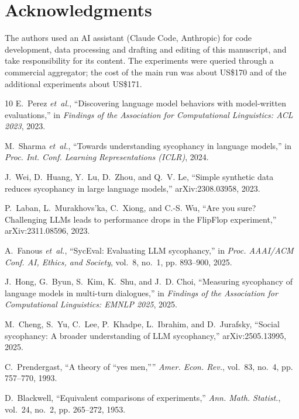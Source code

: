 \documentclass[journal]{IEEEtran}
\begin{document}
\section*{Acknowledgments}
The authors used an AI assistant (Claude Code, Anthropic) for code development, data processing and drafting and editing of this manuscript, and take responsibility for its content. The experiments were queried through a commercial aggregator; the cost of the main run was about US\$170 and of the additional experiments about US\$171.

\begin{thebibliography}{10}
E.~Perez \emph{et~al.}, ``Discovering language model behaviors with model-written evaluations,'' in \emph{Findings of the Association for Computational Linguistics: ACL 2023}, 2023.

M.~Sharma \emph{et~al.}, ``Towards understanding sycophancy in language models,'' in \emph{Proc. Int. Conf. Learning Representations (ICLR)}, 2024.

J.~Wei, D.~Huang, Y.~Lu, D.~Zhou, and Q.~V. Le, ``Simple synthetic data reduces sycophancy in large language models,'' arXiv:2308.03958, 2023.

P.~Laban, L.~Murakhovs'ka, C.~Xiong, and C.-S. Wu, ``Are you sure? Challenging LLMs leads to performance drops in the FlipFlop experiment,'' arXiv:2311.08596, 2023.

A.~Fanous \emph{et~al.}, ``SycEval: Evaluating LLM sycophancy,'' in \emph{Proc. AAAI/ACM Conf. AI, Ethics, and Society}, vol.~8, no.~1, pp. 893--900, 2025.

J.~Hong, G.~Byun, S.~Kim, K.~Shu, and J.~D. Choi, ``Measuring sycophancy of language models in multi-turn dialogues,'' in \emph{Findings of the Association for Computational Linguistics: EMNLP 2025}, 2025.

M.~Cheng, S.~Yu, C.~Lee, P.~Khadpe, L.~Ibrahim, and D.~Jurafsky, ``Social sycophancy: A broader understanding of LLM sycophancy,'' arXiv:2505.13995, 2025.

C.~Prendergast, ``A theory of ``yes men,''{}'' \emph{Amer. Econ. Rev.}, vol.~83, no.~4, pp. 757--770, 1993.

D.~Blackwell, ``Equivalent comparisons of experiments,'' \emph{Ann. Math. Statist.}, vol.~24, no.~2, pp. 265--272, 1953.


\end{thebibliography}
\end{document}
